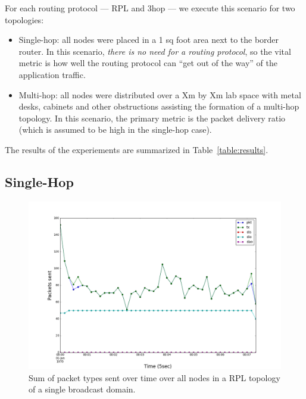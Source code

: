 For each routing protocol --- RPL and 3hop --- we execute this scenario for two topologies:
\begin{itemize}
\item Single-hop: all nodes were placed in a 1 sq foot area next to the border router.
In this scenario, \emph{there is no need for a routing protocol}, so the vital metric is how well the routing protocol can ``get out of the way'' of the application traffic.
\item Multi-hop: all nodes were distributed over a Xm by Xm lab space with metal desks, cabinets and other obstructions assisting the formation of a multi-hop topology.
In this scenario, the primary metric is the packet delivery ratio (which is assumed to be high in the single-hop case).
\end{itemize}

The results of the experiements are summarized in Table~\ref{table:results}.

\subsection{Single-Hop}

\begin{figure}[t]
\centering
\includegraphics[width=\linewidth]{figs/rpl_single_hop.png}
\caption{Sum of packet types sent over time over all nodes in a RPL topology of a single broadcast domain.}
\label{fig:rpl_single_hop}
\end{figure}

